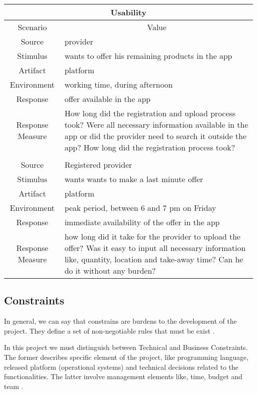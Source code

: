 \begin{table}[H]
    \begin{tabularx}{\textwidth}{|c|X|}
        \hline
        \multicolumn{2}{c}{\textbf{Usability}} \\
        \hline
        \toprule
        \multicolumn{1}{c}{Scenario} & \multicolumn{1}{c}{Value} \\
        \midrule
        Source & \gls{provider} \\
        Stimulus & wants to offer his remaining products in the app \\
        Artifact & platform \\
        Environment & working time, during afternoon \\
        Response & offer available in the app \\
        Response Measure & How long did the registration and upload process took? Were all necessary information
        available in the app or did the \gls{provider} need to search it outside the app? How long did the registration
        process took? \\
         & \\
        Source & Registered \gls{provider} \\
        Stimulus & wants wants to make a last minute offer \\
        Artifact & platform \\
        Environment & peak period, between 6 and 7 pm on Friday \\
        Response & immediate availability of the offer in the app \\
        Response Measure & how long did it take for the \gls{provider} to upload the offer? Was it easy to input all
        necessary information like, quantity, location and take-away time? Can he do it without any burden? \\
        \bottomrule
    \end{tabularx}
\end{table}

\subsection{Constraints}

In general, we can say that constrains are burdens to the development of the project. They define a set of non-negotiable
rules that must be exist \cite{refonline:EFAD}. 

In this project we must distinguish between Technical and Business Constraints. The former describes specific element
of the project, like programming language, released platform (operational systems) and technical decisions related to 
the functionalities. The latter involve management elements like, time, budget and team \cite{refonline:EFAD}.



